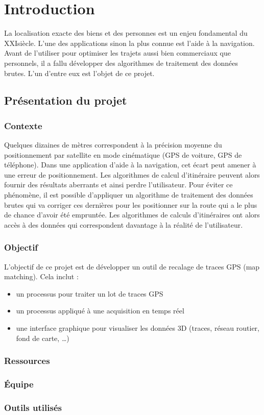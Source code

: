 \chapter{Introduction}
La localisation exacte des biens et des personnes est un enjeu fondamental du XXI\ieme siècle. L'une des applications sinon la plus connue est l'aide à la navigation. Avant de l'utiliser pour optimiser les trajets aussi bien commerciaux que personnels, il a fallu développer des algorithmes de traitement des données brutes. L'un d'entre eux est l'objet de ce projet. 
\section{Présentation du projet}
\subsection{Contexte}
Quelques dizaines de mètres correspondent à la précision moyenne du positionnement par satellite en mode cinématique (GPS de voiture, GPS de téléphone). Dans une application d'aide à la navigation, cet écart peut amener à une erreur de positionnement. Les algorithmes de calcul d'itinéraire peuvent alors fournir des résultats aberrants et ainsi perdre l'utilisateur. Pour éviter ce phénomène, il est possible d'appliquer un algorithme de traitement des données brutes qui va corriger ces dernières pour les positionner sur la route qui a le plus de chance d'avoir été empruntée. Les algorithmes de calculs d'itinéraires ont alors accès à des données qui correspondent davantage à la réalité de l'utilisateur.
\subsection{Objectif}
L'objectif de ce projet est de développer un outil de recalage de traces GPS (map matching). Cela inclut :
\begin{itemize}
\item{} un processus pour traiter un lot de traces GPS
\item{} un processus appliqué à une acquisition en temps réel
\item{} une interface graphique pour visualiser les données 3D (traces, réseau routier, fond de carte, \dots)
\end{itemize}
\subsection{Ressources}
\subsection{\'Equipe}
\subsection{Outils utilisés}